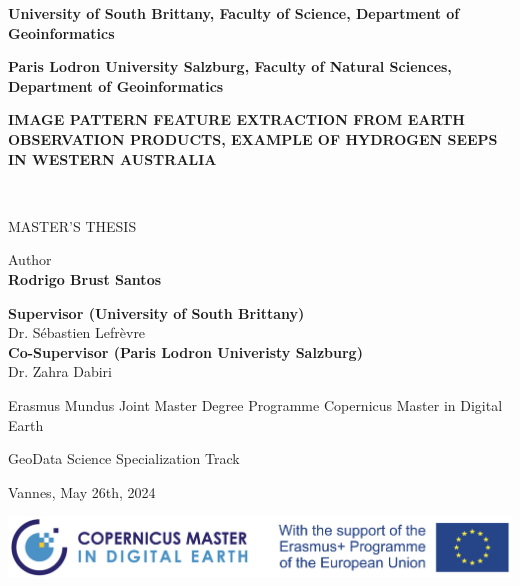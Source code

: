 

\begin{titlepage}\label{title}
{}%
%
\begin{center}


\vspace{3cm}

\vfill

{\bfseries\Large University of South Brittany, Faculty of Science, Department of Geoinformatics\par}

{\bfseries\Large Paris Lodron University Salzburg, Faculty of Natural Sciences, Department of Geoinformatics\par}

\vspace{2.5cm}


\parbox{\textwidth}{\centering\Huge\bfseries IMAGE PATTERN FEATURE EXTRACTION FROM EARTH OBSERVATION PRODUCTS, EXAMPLE OF HYDROGEN SEEPS IN WESTERN AUSTRALIA}\\


\vspace{2cm}

{\large MASTER'S THESIS}

\vspace{1cm}

\sffamily
Author  \\
{\large \textbf{Rodrigo Brust Santos}}

\vfill
{\bfseries Supervisor (University of South Brittany)}\\
Dr. Sébastien Lefrèvre \\
{\bfseries Co-Supervisor (Paris Lodron Univeristy Salzburg)}\\
 Dr. Zahra Dabiri \\

\vspace{1cm}
 
{\Large Erasmus Mundus Joint Master Degree Programme
Copernicus Master in Digital Earth}

{\large GeoData Science Specialization Track}

\vfill
\parbox{\textwidth}{\centering Vannes, May 26th, 2024}

\end{center}

\includegraphics[width=15cm]{templates/logo.pdf}\\

\end{titlepage}

